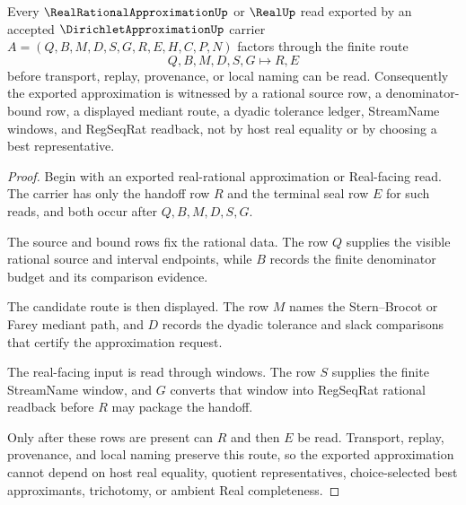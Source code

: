 \begin{theorem}
\label{thm:dirichlet-approximation-finite-handoff}
Every $\RealRationalApproximationUp$ or $\RealUp$ read exported by an accepted $\DirichletApproximationUp$ carrier $A=(Q,B,M,D,S,G,R,E,H,C,P,N)$ factors through the finite route
$$
Q,B,M,D,S,G \longmapsto R,E
$$
before transport, replay, provenance, or local naming can be read. Consequently the exported approximation is witnessed by a rational source row, a denominator-bound row, a displayed mediant route, a dyadic tolerance ledger, StreamName windows, and RegSeqRat readback, not by host real equality or by choosing a best representative.
\end{theorem}
\begin{proof}
Begin with an exported real-rational approximation or Real-facing read. The carrier has only the handoff row $R$ and the terminal seal row $E$ for such reads, and both occur after $Q,B,M,D,S,G$.

The source and bound rows fix the rational data. The row $Q$ supplies the visible rational source and interval endpoints, while $B$ records the finite denominator budget and its comparison evidence.

The candidate route is then displayed. The row $M$ names the Stern--Brocot or Farey mediant path, and $D$ records the dyadic tolerance and slack comparisons that certify the approximation request.

The real-facing input is read through windows. The row $S$ supplies the finite StreamName window, and $G$ converts that window into RegSeqRat rational readback before $R$ may package the handoff.

Only after these rows are present can $R$ and then $E$ be read. Transport, replay, provenance, and local naming preserve this route, so the exported approximation cannot depend on host real equality, quotient representatives, choice-selected best approximants, trichotomy, or ambient Real completeness.
\end{proof}

